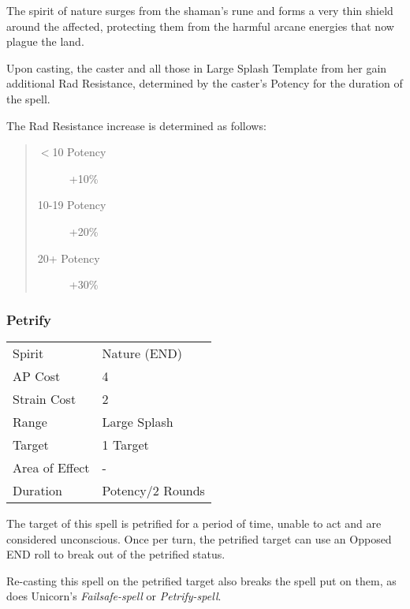 \documentclass[11pt,a4paper,twocolumn]{book}
\begin{document}
The spirit of nature surges from the shaman's rune and forms a very thin shield around the affected, protecting them from the harmful arcane energies that now plague the land.

Upon casting, the caster and all those in Large Splash Template from her gain additional Rad Resistance, determined by the caster's Potency for the duration of the spell. 

The Rad Resistance increase is determined as follows:
\begin{quote}
	\begin{description}
		\item[$<$10 Potency] 	+10\%
		\item[10-19 Potency] 	+20\%
		\item[20+ Potency]  	+30\%
	\end{description}	
\end{quote}


\subsubsection*{Petrify}
{
	\begin{tabu} to 70mm{| X[l,4] | X[l,7] |}
		\hline
		Spirit         & Nature (END)          \\
		AP Cost        & 4                     \\
		Strain Cost    & 2                     \\
		Range          & Large Splash          \\
		Target         & 1 Target              \\
		Area of Effect & -                     \\
		Duration       & Potency/2 Rounds \\ \hline
	\end{tabu}
	
}
\medskip

The target of this spell is petrified for a period of time, unable to act and are considered unconscious. Once per turn, the petrified target can use an Opposed END roll to break out of the petrified status. 

Re-casting this spell on the petrified target also breaks the spell put on them, as does Unicorn's \textit{Failsafe-spell} or \textit{Petrify-spell}.
\end{document}

